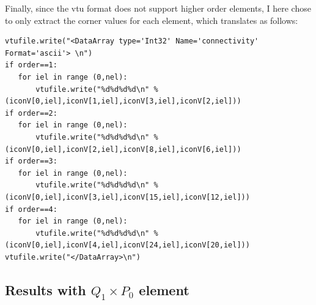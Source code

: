 Finally, since the vtu format does not support higher order elements, I 
here chose to only extract the corner values for each element, 
which translates as follows:
\begin{lstlisting}
vtufile.write("<DataArray type='Int32' Name='connectivity' Format='ascii'> \n")
if order==1:
   for iel in range (0,nel):
       vtufile.write("%d%d%d%d\n" %(iconV[0,iel],iconV[1,iel],iconV[3,iel],iconV[2,iel]))
if order==2:
   for iel in range (0,nel):
       vtufile.write("%d%d%d%d\n" %(iconV[0,iel],iconV[2,iel],iconV[8,iel],iconV[6,iel]))
if order==3:
   for iel in range (0,nel):
       vtufile.write("%d%d%d%d\n" %(iconV[0,iel],iconV[3,iel],iconV[15,iel],iconV[12,iel]))
if order==4:
   for iel in range (0,nel):
       vtufile.write("%d%d%d%d\n" %(iconV[0,iel],iconV[4,iel],iconV[24,iel],iconV[20,iel]))
vtufile.write("</DataArray>\n")
\end{lstlisting}



\subsection*{Results with $Q_1\times P_0$ element}


